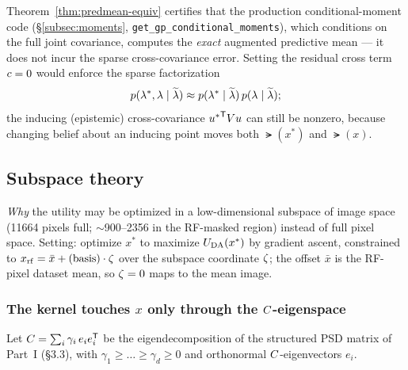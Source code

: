 \begin{remark}
Theorem~\ref{thm:predmean-equiv} certifies that the production conditional-moment
code (\S\ref{subsec:moments}, \texttt{get\_\allowbreak gp\_\allowbreak conditional\_\allowbreak moments}), which
conditions on the full joint covariance, computes the \emph{exact} augmented
predictive mean --- it does not incur the sparse cross-covariance error.
Setting the residual cross term $c=0$ would enforce the sparse factorization
\[
  p(\lambda^*,\lambda\mid\widetilde{\lambda})\approx p(\lambda^*\mid\widetilde{\lambda})\,p(\lambda\mid\widetilde{\lambda});
\]
the inducing (epistemic) cross-covariance ${u^*}^{\mathsf{T}}Vu$ can still be
nonzero, because changing belief about an inducing point moves both $\lat(x^*)$
and $\lat(x)$.
\end{remark}

\subsection{Subspace theory}
\label{subsec:subspace}

\emph{Why} the utility may be optimized in a low-dimensional subspace of image
space (11664 pixels full; $\sim$900--2356 in the RF-masked region) instead of
full pixel space. Setting: optimize $x^*$ to maximize $U_{\mathrm{DA}}(x^*)$ by gradient
ascent, constrained to $x_{\mathrm{rf}}=\bar{x}+\text{(basis)}\cdot\zeta$ over the
subspace coordinate $\zeta$; the offset $\bar{x}$ is the RF-pixel dataset mean, so
$\zeta=0$ maps to the mean image.

\subsubsection{The kernel touches $x$ only through the $C$-eigenspace}
Let $C=\sum_i\gamma_i\,e_i e_i^{\mathsf{T}}$ be the eigendecomposition of the
structured PSD matrix of Part~I (\S3.3), with $\gamma_1\ge\dots\ge\gamma_d\ge0$
and orthonormal $C$-eigenvectors $e_i$.

